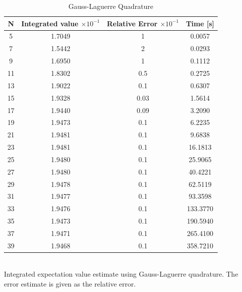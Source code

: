 \documentclass[%
reprint,
amsmath,amssymb,
aps,
]{revtex4-1}
\begin{document}
\begin{table}[!h]
	\caption{Gauss-Laguerre Quadrature }
	\begin{tabular}{|c|c|c|c|}
		\hline 
		\hspace{5mm} \textbf{N} \hspace{5mm} & \textbf{Integrated value} $\times 10^{-1}$ & \textbf{Relative Error} $\times 10^{-1}$ & \hspace{3mm}\textbf{Time  [s]} \hspace{5mm}\\
		\hline 
			5 & 1.7049  & 1  & 0.0057 \\
			7 & 1.5442  & 2  & 0.0293 \\
			9 & 1.6950  & 1  & 0.1112 \\
			11 & 1.8302  & 0.5  & 0.2725 \\
			13 & 1.9022  & 0.1  & 0.6307 \\
			15 & 1.9328  & 0.03  & 1.5614 \\
			17 & 1.9440  & 0.09  & 3.2090 \\
			19 & 1.9473  & 0.1  & 6.2235 \\
			21 & 1.9481  & 0.1  & 9.6838 \\
			23 & 1.9481  & 0.1  & 16.1813 \\
			25 & 1.9480  & 0.1  & 25.9065 \\
			27 & 1.9480  & 0.1  & 40.4221 \\
			29 & 1.9478  & 0.1  & 62.5119 \\
			31 & 1.9477  & 0.1  & 93.3598 \\
			33 & 1.9476  & 0.1  & 133.3770 \\
			35 & 1.9473  & 0.1  & 190.5940 \\
			37 & 1.9471  & 0.1  & 265.4100 \\
			39 & 1.9468  & 0.1  & 358.7210 \\

		
		\hline 
	\end{tabular}
	\\ [3pt] \label{laguerre_values} \centering Integrated expectation value estimate using Gauss-Laguerre quadrature. The error estimate is given as the relative error.
\end{table}
\end{document}
